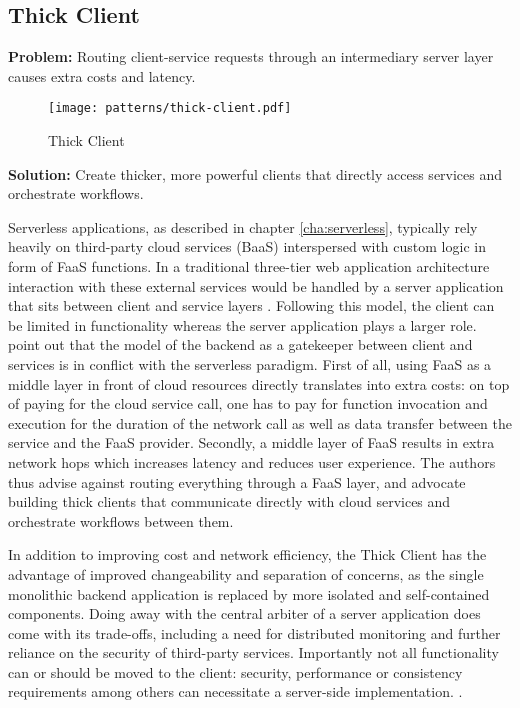 \subsection{Thick Client} \label{subsec:thickClient}

\textbf{Problem:} Routing client-service requests through an intermediary server layer causes extra costs and latency.

\begin{figure}[h]
  \centering
  \texttt{[image: patterns/thick-client.pdf]}
  \caption{Thick Client}
  \label{fig:patternThickClient}
\end{figure}

\textbf{Solution:} Create thicker, more powerful clients that directly access services and orchestrate workflows.

Serverless applications, as described in chapter \ref{cha:serverless}, typically rely heavily on third-party cloud services (BaaS) interspersed with custom logic in form of FaaS functions. In a traditional three-tier web application architecture interaction with these external services would be handled by a server application that sits between client and service layers \parencite{robert2016serverlessarchitectures}. Following this model, the client can be limited in functionality whereas the server application plays a larger role. \textcite{sbarski2017serverless} point out that the model of the backend as a gatekeeper between client and services is in conflict with the serverless paradigm. First of all, using FaaS as a middle layer in front of cloud resources directly translates into extra costs: on top of paying for the cloud service call, one has to pay for function invocation and execution for the duration of the network call as well as data transfer between the service and the FaaS provider. Secondly, a middle layer of FaaS results in extra network hops which increases latency and reduces user experience. The authors thus advise against routing everything through a FaaS layer, and advocate building thick clients that communicate directly with cloud services and orchestrate workflows between them.

In addition to improving cost and network efficiency, the Thick Client has the advantage of improved changeability and separation of concerns, as the single monolithic backend application is replaced by more isolated and self-contained components. Doing away with the central arbiter of a server application does come with its trade-offs, including a need for distributed monitoring and further reliance on the security of third-party services. Importantly not all functionality can or should be moved to the client: security, performance or consistency requirements among others can necessitate a server-side implementation. \parencite{robert2016serverlessarchitectures}.

